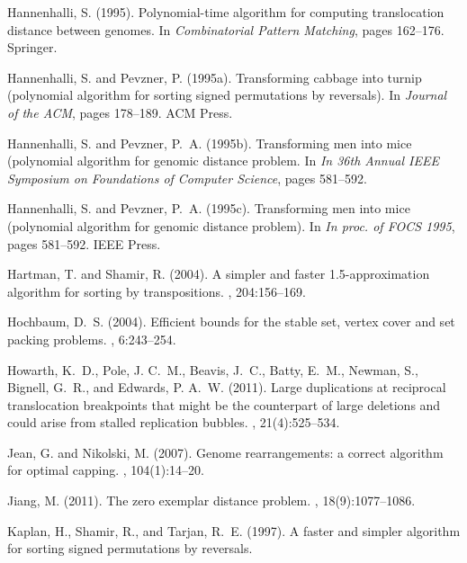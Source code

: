 \documentclass[11pt,final,twoside,nofrench]{thlifl}
\begin{document}
{\begin{thebibliography}{}
Hannenhalli, S. (1995).
\newblock Polynomial-time algorithm for computing translocation distance
  between genomes.
\newblock In {\em Combinatorial Pattern Matching}, pages 162--176. Springer.

Hannenhalli, S. and Pevzner, P. (1995a).
\newblock Transforming cabbage into turnip (polynomial algorithm for sorting
  signed permutations by reversals).
\newblock In {\em Journal of the ACM}, pages 178--189. ACM Press.

Hannenhalli, S. and Pevzner, P.~A. (1995b).
\newblock Transforming men into mice (polynomial algorithm for genomic distance
  problem.
\newblock In {\em In 36th Annual IEEE Symposium on Foundations of Computer
  Science}, pages 581--592.

Hannenhalli, S. and Pevzner, P.~A. (1995c).
\newblock Transforming men into mice (polynomial algorithm for genomic distance
  problem).
\newblock In {\em In proc. of FOCS 1995}, pages 581--592. IEEE Press.

Hartman, T. and Shamir, R. (2004).
\newblock A simpler and faster 1.5-approximation algorithm for sorting by
  transpositions.
, 204:156--169.

Hochbaum, D.~S. (2004).
\newblock Efficient bounds for the stable set, vertex cover and set packing
  problems.
, 6:243--254.

Howarth, K.~D., Pole, J. C.~M., Beavis, J.~C., Batty, E.~M., Newman, S.,
  Bignell, G.~R., and Edwards, P. A.~W. (2011).
\newblock Large duplications at reciprocal translocation breakpoints that might
  be the counterpart of large deletions and could arise from stalled
  replication bubbles.
, 21(4):525--534.

Jean, G. and Nikolski, M. (2007).
\newblock Genome rearrangements: a correct algorithm for optimal capping.
, 104(1):14--20.

Jiang, M. (2011).
\newblock The zero exemplar distance problem.
, 18(9):1077--1086.

Kaplan, H., Shamir, R., and Tarjan, R.~E. (1997).
\newblock A faster and simpler algorithm for sorting signed permutations by
  reversals.


\end{thebibliography}}
\end{document}
